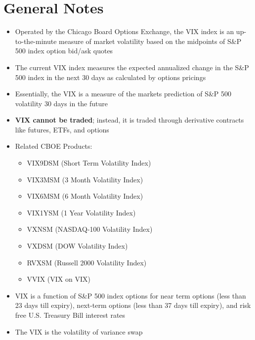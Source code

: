 \documentclass{article}
\begin{document}
\section*{General Notes}
\begin{itemize}
    \item Operated by the Chicago Board Options Exchange, the VIX index is an up-to-the-minute measure of market volatility based on the midpoints of S\&P 500 index option bid/ask quotes
    \item The current VIX index measures the expected annualized change in the S\&P 500 index in the next 30 days as calculated by options pricings
    \item Essentially, the VIX is a measure of the markets prediction of S\&P 500 volatility 30 days in the future
    \item \textbf{VIX cannot be traded}; instead, it is traded through derivative contracts like futures, ETFs, and options
    \item Related CBOE Products:
    \begin{itemize}
        \item VIX9DSM (Short Term Volatility Index)
        \item VIX3MSM (3 Month Volatility Index)
        \item VIX6MSM (6 Month Volatility Index)
        \item VIX1YSM (1 Year Volatility Index)
        \item VXNSM (NASDAQ-100 Volatility Index)
        \item VXDSM (DOW Volatility Index)
        \item RVXSM (Russell 2000 Volatility Index)
        \item VVIX (VIX on VIX)
    \end{itemize}
    \item VIX is a function of S\&P 500 index options for near term options (less than 23 days till expiry), next-term options (less than 37 days till expiry), and risk free U.S. Treasury Bill interest rates
    \item The VIX is the volatility of variance swap

\end{itemize}
\end{document}
